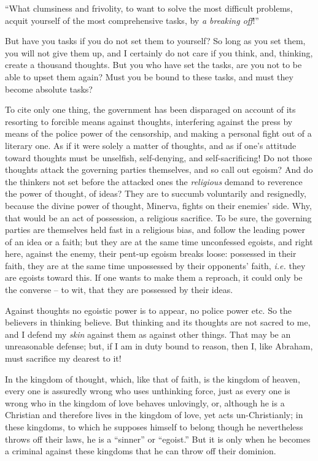 ``What clumsiness and frivolity, to want to solve the most difficult 
problems, acquit yourself of the most comprehensive tasks, by \textit{a 
breaking off}!''

But have you tasks if you do not set them to yourself? So long as you set 
them, you will not give them up, and I certainly do not care if you think, 
and, thinking, create a thousand thoughts. But you who have set the tasks, are 
you not to be able to upset them again? Must you be bound to these tasks, and 
must they become absolute tasks?

To cite only one thing, the government has been disparaged on account of its 
resorting to forcible means against thoughts, interfering against the press by 
means of the police power of the censorship, and making a personal fight out 
of a literary one. As if it were solely a matter of thoughts, and as if one's 
attitude toward thoughts must be unselfish, self-denying, and 
self-sacrificing! Do not those thoughts attack the governing parties 
themselves, and so call out egoism? And do the thinkers not set before the 
attacked ones the \textit{religious} demand to reverence the power of thought, 
of ideas? They are to succumb voluntarily and resignedly, because the divine 
power of thought, Minerva, fights on their enemies' side. Why, that would be 
an act of possession, a religious sacrifice. To be sure, the governing parties 
are themselves held fast in a religious bias, and follow the leading power of 
an idea or a faith; but they are at the same time unconfessed egoists, and 
right here, against the enemy, their pent-up egoism breaks loose: possessed in 
their faith, they are at the same time unpossessed by their opponents' faith, 
\textit{i.e.} they are egoists toward this. If one wants to make them a 
reproach, it could only be the converse -- to wit, that they are possessed by 
their ideas.

Against thoughts no egoistic power is to appear, no police power etc. So the 
believers in thinking believe. But thinking and its thoughts are not sacred to 
me, and I defend my \textit{skin} against them as against other things. That 
may be an unreasonable defense; but, if I am in duty bound to reason, then I, 
like Abraham, must sacrifice my dearest to it!

In the kingdom of thought, which, like that of faith, is the kingdom of 
heaven, every one is assuredly wrong who uses unthinking force, just as every 
one is wrong who in the kingdom of love behaves unlovingly, or, although he is 
a Christian and therefore lives in the kingdom of love, yet acts 
un-Christianly; in these kingdoms, to which he supposes himself to belong 
though he nevertheless throws off their laws, he is a ``sinner'' or 
``egoist.'' But it is only when he becomes a criminal against these kingdoms 
that he can throw off their dominion.

